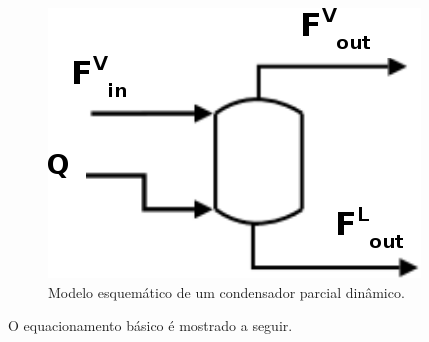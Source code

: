\begin{figure}[htb]
\centering \includegraphics[scale=0.5]{images/Chap3/esquemacondenser2.png}
\caption{Modelo esquemático de um condensador parcial dinâmico.}
\label{fig:condenser}
\end{figure}

O equacionamento básico é mostrado a seguir.

